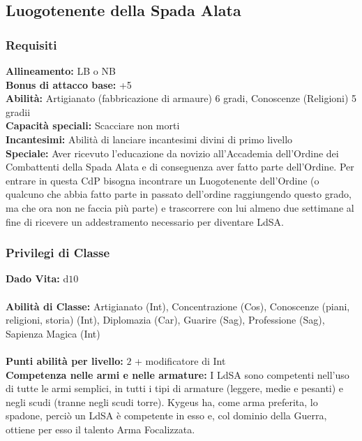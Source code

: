 \documentclass[10pt, a4paper]{report}
\begin{document}
\newpage
\begin{multicols}{2}

\section{Luogotenente della Spada Alata}

\subsubsection*{Requisiti}
\textbf{Allineamento:} LB o NB\\
\textbf{Bonus di attacco base:} +5\\
\textbf{Abilità:} Artigianato (fabbricazione di armaure) 6 gradi, Conoscenze (Religioni) 5 gradii\\
\textbf{Capacità speciali:} Scacciare non morti\\
\textbf{Incantesimi:} Abilità di lanciare incantesimi divini di primo livello\\
\textbf{Speciale:} Aver ricevuto l’educazione da novizio all’Accademia dell’Ordine dei Combattenti della Spada Alata e di conseguenza aver fatto parte dell’Ordine. Per entrare in questa CdP bisogna incontrare un Luogotenente dell’Ordine (o qualcuno che abbia fatto parte in passato dell’ordine raggiungendo questo grado, ma che ora non ne faccia più parte) e trascorrere con lui almeno due settimane al fine di ricevere un addestramento necessario per diventare LdSA.\\
\subsubsection*{Privilegi di Classe}
\textbf{Dado Vita:} d$10$\\
\\
\textbf{Abilità di Classe:} Artigianato (Int), Concentrazione (Cos), Conoscenze (piani, religioni, storia) (Int), Diplomazia (Car), Guarire (Sag), Professione (Sag), Sapienza Magica (Int)\\
\\
\textbf{Punti abilità per livello:} $2$ + modificatore di Int\\

\textbf{Competenza nelle armi e nelle armature:} I LdSA sono competenti nell’uso di tutte le armi semplici, in tutti i tipi di armature (leggere, medie e pesanti) e negli scudi (tranne negli scudi torre). Kygeus ha, come arma preferita, lo spadone, perciò un LdSA è competente in esso e, col dominio della Guerra, ottiene per esso il talento Arma Focalizzata.\\


\end{multicols}
\end{document}
